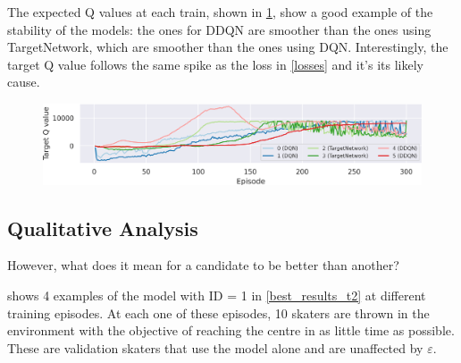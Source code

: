 The expected Q values at each train, shown in \cref{q_values}, show a good example of the stability of the models: the ones for DDQN are smoother than the ones using TargetNetwork, which are smoother than the ones using DQN.
Interestingly, the target Q value follows the same spike as the loss in \cref{losses} and it's its likely cause.
\begin{figure}[h]
	\includegraphics[width=\textwidth]{q_values.png}
	\label{q_values}
\end{figure}

\newpage{}
\subsection{Qualitative Analysis}

However, what does it mean for a candidate to be better than another?

 shows 4 examples of the model with ID = 1 in \cref{best_results_t2} at different training episodes.
At each one of these episodes, 10 skaters are thrown in the environment with the objective of reaching the centre in as little time as possible.
These are validation skaters that use the model alone and are unaffected by $\varepsilon$.

